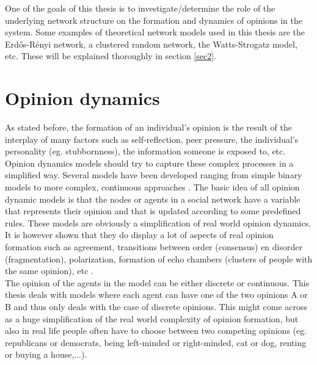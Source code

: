 \documentclass[11 pt , letterpaper , twoside , openright]{book}
\begin{document}
One of the goals of this thesis is to investigate/determine the role of the underlying network structure on the formation and dynamics of opinions in the system. Some examples of theoretical network models used in this thesis are the Erd\H{o}s-R\'{e}nyi network, a clustered random network, the Watts-Strogatz model, etc. These will be explained thoroughly in section \ref{sec2}. %


\section{Opinion dynamics}

As stated before, the formation of an individual's opinion is the result of the interplay of many factors such as self-reflection, peer pressure, the individual's personality (eg. stubbornness), the information someone is exposed to, etc.  Opinion dynamics models should try to capture these complex processes in a simplified way. Several models have been developed ranging from simple binary models to more complex, continuous approaches \cite{Sirbu2016}. The basic idea of all opinion dynamic models is that the nodes or agents in a social network have a variable that represents their opinion and that is updated according to some predefined rules. These models are obviously a simplification of real world opinion dynamics. It is however shown that they do display a lot of aspects of real opinion formation such as agreement, transitions between order (consensus) en disorder (fragmentation), polarization, formation of echo chambers (clusters of people with the same opinion), etc \cite{Sirbu2016}. \\
The opinion of the agents in the model can be either discrete or continuous. This thesis deals with models where each agent can have one of the two opinions A or B and thus only deals with the case of discrete opinions. This might come across as a huge simplification of the real world complexity of opinion formation, but also in real life people often have to choose between two competing opinions (eg. republicans or democrats, being left-minded or right-minded, cat or dog, renting or buying a house,...). \\
\end{document}
